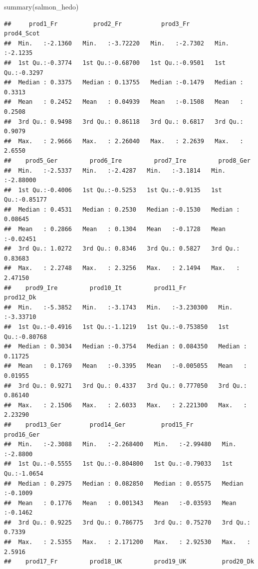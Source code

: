 \documentclass[
]{book}
\newenvironment{Shaded}{\begin{snugshade}}{\end{snugshade}}
\newcommand{\FunctionTok}[1]{\textcolor[rgb]{0.00,0.00,0.00}{#1}}
\newcommand{\NormalTok}[1]{#1}
\begin{document}
\begin{Shaded}
\begin{Highlighting}[]
\FunctionTok{summary}\NormalTok{(salmon\_hedo)}
\end{Highlighting}
\end{Shaded}

\begin{verbatim}
##     prod1_Fr          prod2_Fr           prod3_Fr         prod4_Scot     
##  Min.   :-2.1360   Min.   :-3.72220   Min.   :-2.7302   Min.   :-2.1235  
##  1st Qu.:-0.3774   1st Qu.:-0.68700   1st Qu.:-0.9501   1st Qu.:-0.3297  
##  Median : 0.3375   Median : 0.13755   Median :-0.1479   Median : 0.3313  
##  Mean   : 0.2452   Mean   : 0.04939   Mean   :-0.1508   Mean   : 0.2508  
##  3rd Qu.: 0.9498   3rd Qu.: 0.86118   3rd Qu.: 0.6817   3rd Qu.: 0.9079  
##  Max.   : 2.9666   Max.   : 2.26040   Max.   : 2.2639   Max.   : 2.6550  
##    prod5_Ger         prod6_Ire         prod7_Ire         prod8_Ger       
##  Min.   :-2.5337   Min.   :-2.4287   Min.   :-3.1814   Min.   :-2.88000  
##  1st Qu.:-0.4006   1st Qu.:-0.5253   1st Qu.:-0.9135   1st Qu.:-0.85177  
##  Median : 0.4531   Median : 0.2530   Median :-0.1530   Median : 0.08645  
##  Mean   : 0.2866   Mean   : 0.1304   Mean   :-0.1728   Mean   :-0.02451  
##  3rd Qu.: 1.0272   3rd Qu.: 0.8346   3rd Qu.: 0.5827   3rd Qu.: 0.83683  
##  Max.   : 2.2748   Max.   : 2.3256   Max.   : 2.1494   Max.   : 2.47150  
##    prod9_Ire         prod10_It         prod11_Fr           prod12_Dk       
##  Min.   :-5.3852   Min.   :-3.1743   Min.   :-3.230300   Min.   :-3.33710  
##  1st Qu.:-0.4916   1st Qu.:-1.1219   1st Qu.:-0.753850   1st Qu.:-0.80768  
##  Median : 0.3034   Median :-0.3754   Median : 0.084350   Median : 0.11725  
##  Mean   : 0.1769   Mean   :-0.3395   Mean   :-0.005055   Mean   : 0.01955  
##  3rd Qu.: 0.9271   3rd Qu.: 0.4337   3rd Qu.: 0.777050   3rd Qu.: 0.86140  
##  Max.   : 2.1506   Max.   : 2.6033   Max.   : 2.221300   Max.   : 2.23290  
##    prod13_Ger        prod14_Ger          prod15_Fr          prod16_Ger     
##  Min.   :-2.3088   Min.   :-2.268400   Min.   :-2.99480   Min.   :-2.8800  
##  1st Qu.:-0.5555   1st Qu.:-0.804800   1st Qu.:-0.79033   1st Qu.:-1.0654  
##  Median : 0.2975   Median : 0.082850   Median : 0.05575   Median :-0.1009  
##  Mean   : 0.1776   Mean   : 0.001343   Mean   :-0.03593   Mean   :-0.1462  
##  3rd Qu.: 0.9225   3rd Qu.: 0.786775   3rd Qu.: 0.75270   3rd Qu.: 0.7339  
##  Max.   : 2.5355   Max.   : 2.171200   Max.   : 2.92530   Max.   : 2.5916  
##    prod17_Fr         prod18_UK         prod19_UK          prod20_Dk      

\end{verbatim}
\end{document}
